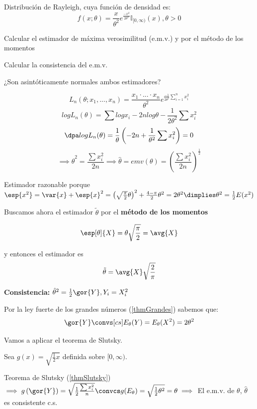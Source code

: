 \begin{problem}[5]
Distribución de Rayleigh, cuya función de densidad es:
\[f(x;\theta) = \frac{x}{\theta^2} e^{\frac{-x^2}{2\theta^2}} \mathbb{I}_{[0,\infty)} (x), \theta > 0\]

\ppart Calcular el estimador de máxima verosimilitud (e.m.v.) y por el método de los momentos

\ppart Calcular la consistencia del e.m.v.

\ppart ¿Son asintóticamente normales ambos estimadores?

\solution

\spart

\[L_n(\theta;x_1,...,x_n) = \frac{x_1 \cdot ... \cdot x_n}{\theta^2} e^{\frac{-1}{2\theta^2} \sum_{i=1}^n x_i^2}\]
\[log L_n(\theta) = \sum log x_i - 2nlog\theta -\frac{1}{2\theta^2}\sum x_i^2\]
\[\dpa log L_n(\theta) = \frac{1}{\theta} \left(-2n+\frac{1}{\theta^2}\sum x_i^2\right) = 0\]
\[\implies \hat{\theta}^2 = \frac{\sum x_i^2}{2n} \implies \hat{\theta} =  emv(\theta) =\left(\frac{\sum x_i^2}{2n}\right)^{\frac{1}{2}}\]

Estimador razonable porque $\esp{x^2} = \var{x} + \esp{x}^2 = \left(\sqrt{\frac{\pi}{2}}\theta\right)^2 + \frac{4-\pi}{2} \theta^2 = 2\theta^2 \dimplies \theta^2 = \frac{1}{2} E(x^2)$

Buscamos ahora el estimador $\tilde\theta$ por el \textbf{método de los momentos}

\[ \esp[\theta]{X}= \theta\sqrt{\frac{\pi}{2}} = \avg{X} \] 

y entonces el estimador es \[\tilde{\theta} = \avg{X}\sqrt{\frac{2}{\pi}} \]

\spart

\textbf{Consistencia:} $\hat{\theta}^2 = \frac{1}{2} \gor{Y}, Y_i = X_i^2$

Por la ley fuerte de los grandes números (\ref{thmGrandes}) sabemos que:
\begin{gather*}
\gor{Y} \convs[cs] E_{\theta}(Y) = E_{\theta}(X^2) = 2\theta^2
\end{gather*}

Vamos a aplicar el teorema de Slutsky.

Sea $g(x) = \sqrt{\frac{1}{2}x}$ definida sobre $[0,\infty)$.

Teorema de Slutsky (\ref{thmSlutsky}) $\implies g\left(\gor{Y}\right) = \sqrt{\frac{1}{2} \frac{\sum x_i^2}{n}} \convcs g(E_{\theta}) = \sqrt{\frac{1}{2}\theta^2} = \theta \implies $ El e.m.v. de $\theta$, $\hat{\theta}$ es consistente c.s.



\end{problem}
